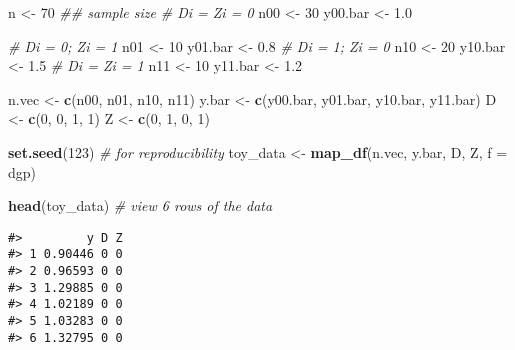 \documentclass[
]{article}
\newenvironment{Shaded}{\begin{snugshade}}{\end{snugshade}}
\newcommand{\CommentTok}[1]{\textcolor[rgb]{0.56,0.35,0.01}{\textit{#1}}}
\newcommand{\DataTypeTok}[1]{\textcolor[rgb]{0.13,0.29,0.53}{#1}}
\newcommand{\DecValTok}[1]{\textcolor[rgb]{0.00,0.00,0.81}{#1}}
\newcommand{\FloatTok}[1]{\textcolor[rgb]{0.00,0.00,0.81}{#1}}
\newcommand{\KeywordTok}[1]{\textcolor[rgb]{0.13,0.29,0.53}{\textbf{#1}}}
\newcommand{\NormalTok}[1]{#1}
\newcommand{\StringTok}[1]{\textcolor[rgb]{0.31,0.60,0.02}{#1}}
\begin{document}
\begin{Shaded}
\begin{Highlighting}[]
\NormalTok{n \textless{}{-}}\StringTok{ }\DecValTok{70} \CommentTok{\#\# sample size}
\CommentTok{\# Di = Zi = 0}
\NormalTok{n00 \textless{}{-}}\StringTok{ }\DecValTok{30}
\NormalTok{y00.bar \textless{}{-}}\StringTok{ }\FloatTok{1.0}

\CommentTok{\# Di = 0; Zi = 1}
\NormalTok{n01 \textless{}{-}}\StringTok{ }\DecValTok{10}
\NormalTok{y01.bar \textless{}{-}}\StringTok{ }\FloatTok{0.8}
\CommentTok{\# Di = 1; Zi = 0}
\NormalTok{n10 \textless{}{-}}\StringTok{ }\DecValTok{20}
\NormalTok{y10.bar \textless{}{-}}\StringTok{ }\FloatTok{1.5}
\CommentTok{\# Di = Zi = 1}
\NormalTok{n11 \textless{}{-}}\StringTok{ }\DecValTok{10}
\NormalTok{y11.bar \textless{}{-}}\StringTok{ }\FloatTok{1.2}

\NormalTok{n.vec \textless{}{-}}\StringTok{ }\KeywordTok{c}\NormalTok{(n00, n01, n10, n11)}
\NormalTok{y.bar \textless{}{-}}\StringTok{ }\KeywordTok{c}\NormalTok{(y00.bar, y01.bar, y10.bar, y11.bar)}
\NormalTok{D \textless{}{-}}\StringTok{ }\KeywordTok{c}\NormalTok{(}\DecValTok{0}\NormalTok{, }\DecValTok{0}\NormalTok{, }\DecValTok{1}\NormalTok{, }\DecValTok{1}\NormalTok{)}
\NormalTok{Z \textless{}{-}}\StringTok{ }\KeywordTok{c}\NormalTok{(}\DecValTok{0}\NormalTok{, }\DecValTok{1}\NormalTok{, }\DecValTok{0}\NormalTok{, }\DecValTok{1}\NormalTok{)}

\KeywordTok{set.seed}\NormalTok{(}\DecValTok{123}\NormalTok{) }\CommentTok{\# for reproducibility}
\NormalTok{toy\_data \textless{}{-}}\StringTok{ }\KeywordTok{map\_df}\NormalTok{(n.vec, y.bar, D, Z, }\DataTypeTok{f =}\NormalTok{ dgp)}

\KeywordTok{head}\NormalTok{(toy\_data) }\CommentTok{\# view 6 rows of the data}
\end{Highlighting}
\end{Shaded}

\begin{verbatim}
#>         y D Z
#> 1 0.90446 0 0
#> 2 0.96593 0 0
#> 3 1.29885 0 0
#> 4 1.02189 0 0
#> 5 1.03283 0 0
#> 6 1.32795 0 0
\end{verbatim}
\end{document}

